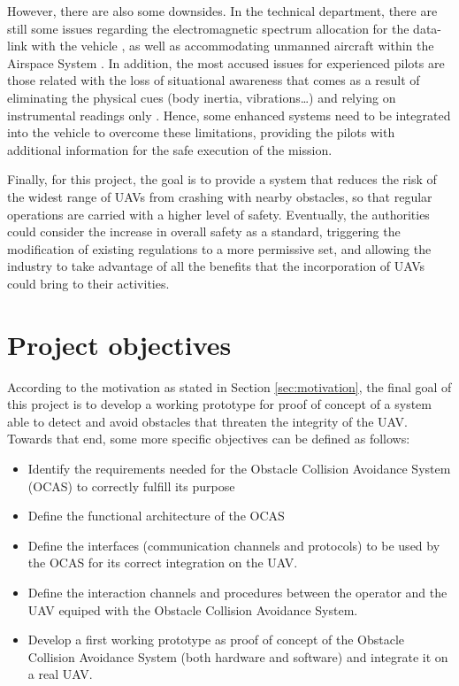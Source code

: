 However, there are also some downsides.
In the technical department, there are still some issues regarding the electromagnetic spectrum allocation for the data-link with the vehicle \cite{civilianunmannedaerialvehiclesreadyfortakeoff2012}, as well as accommodating unmanned aircraft within the Airspace System \cite{unmannedaircraftsystemsperceptionsandpotentials2013}.
In addition, the most accused issues for experienced pilots are those related with the loss of situational awareness that comes as a result of eliminating the physical cues (body inertia, vibrations\ldots) and relying on instrumental readings only \cite{bergqvist2014}.
Hence, some enhanced systems need to be integrated into the vehicle to overcome these limitations, providing the pilots with additional information for the safe execution of the mission.

Finally, for this project, the goal is to provide a system that reduces the risk of the widest range of UAVs from crashing with nearby obstacles, so that regular operations are carried with a higher level of safety.
Eventually, the authorities could consider the increase in overall safety as a standard, triggering the modification of existing regulations to a more permissive set, and allowing the industry to take advantage of all the benefits that the incorporation of UAVs could bring to their activities.

\section{Project objectives} \label{sec:objectives}

According to the motivation as stated in Section \ref{sec:motivation}, the final goal of this project is to develop a working prototype for proof of concept of a system able to detect and avoid obstacles that threaten the integrity of the UAV.
Towards that end, some more specific objectives can be defined as follows:

\begin{itemize}
	\item Identify the requirements needed for the Obstacle Collision Avoidance System (OCAS) to correctly fulfill its purpose
	\item Define the functional architecture of the OCAS
	\item Define the interfaces (communication channels and protocols) to be used by the OCAS for its correct integration on the UAV.
	\item Define the interaction channels and procedures between the operator and the UAV equiped with the Obstacle Collision Avoidance System.
	\item Develop a first working prototype as proof of concept of the Obstacle Collision Avoidance System (both hardware and software) and integrate it on a real UAV.
\end{itemize}

